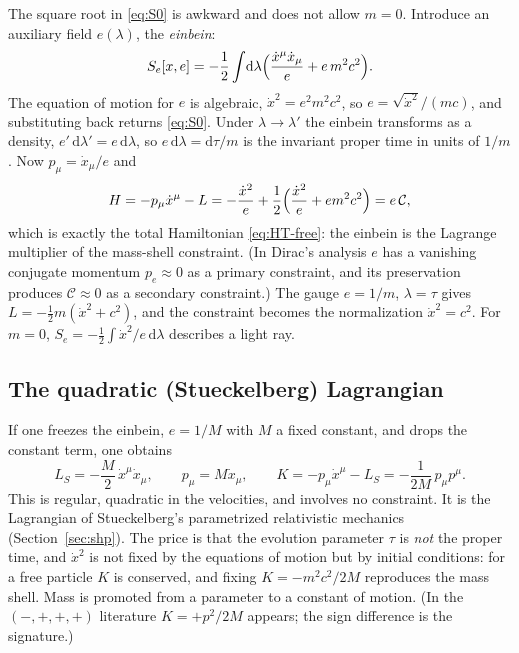 \documentclass[11pt,a4paper]{book}
\numberwithin{equation}{section}
\newcommand{\dd}{\mathrm{d}}
\newcommand{\Cc}{\mathcal{C}}          %
\theoremstyle{definition}
\theoremstyle{remark}
\begin{document}
The square root in \eqref{eq:S0} is awkward and does not allow $m=0$.  Introduce an
auxiliary field $e(\lambda)$, the \emph{einbein}:
\begin{equation}
  S_e[x,e]=-\frac12\int\!\dd\lambda\Bigl(\frac{\dot x^\mu\dot x_\mu}{e}+e\,m^2c^2\Bigr).
  \label{eq:Se-free}
\end{equation}
The equation of motion for $e$ is algebraic, $\dot x^2=e^2m^2c^2$, so
$e=\sqrt{\dot x^2}/(mc)$, and substituting back returns \eqref{eq:S0}.
Under $\lambda\to\lambda'$ the einbein transforms as a density,
$e'\,\dd\lambda'=e\,\dd\lambda$, so $e\,\dd\lambda=\dd\tau/m$ is the invariant
proper time in units of $1/m$.  Now $p_\mu=\dot x_\mu/e$ and
\begin{equation}
  H=-p_\mu\dot x^\mu-L=-\frac{\dot x^2}{e}+\frac12\Bigl(\frac{\dot x^2}{e}+em^2c^2\Bigr)
  =e\,\Cc,
\end{equation}
which is exactly the total Hamiltonian \eqref{eq:HT-free}: the einbein is
the Lagrange multiplier of the mass-shell constraint.  (In Dirac's
analysis $e$ has a vanishing conjugate momentum $p_e\approx0$ as a primary
constraint, and its preservation produces $\Cc\approx0$ as a secondary
constraint.)  The gauge $e=1/m$, $\lambda=\tau$ gives
$L=-\tfrac12m(\dot x^2+c^2)$, and the constraint becomes the normalization
$\dot x^2=c^2$.  For $m=0$, $S_e=-\tfrac12\int\dot x^2/e\,\dd\lambda$ describes a
light ray.

\subsection{The quadratic (Stueckelberg) Lagrangian}

If one freezes the einbein, $e=1/M$ with $M$ a fixed constant, and drops the
constant term, one obtains
\begin{equation}
  L_{S}=-\frac M2\,\dot x^\mu\dot x_\mu,\qquad
  p_\mu=M\dot x_\mu,\qquad
  K=-p_\mu\dot x^\mu-L_S=-\frac{1}{2M}\,p_\mu p^\mu .
  \label{eq:LS-free}
\end{equation}
This is regular, quadratic in the velocities, and involves no constraint.
It is the Lagrangian of Stueckelberg's parametrized relativistic mechanics
(Section~\ref{sec:shp}).  The price is that the evolution parameter $\tau$
is \emph{not} the proper time, and $\dot x^2$ is not fixed by the
equations of motion but by initial conditions: for a free particle $K$ is
conserved, and fixing $K=-m^2c^2/2M$ reproduces the mass shell.  Mass is
promoted from a parameter to a constant of motion.  (In the $(-,+,+,+)$
literature $K=+p^2/2M$ appears; the sign difference is the signature.)
\end{document}
